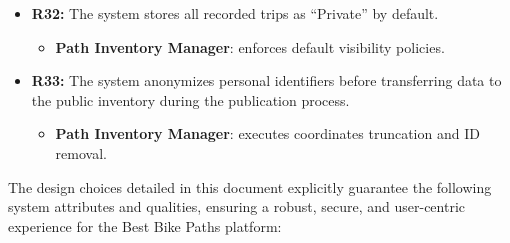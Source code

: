 \begin{itemize}
          \begin{itemize}
              \item \textbf{Trip Controller}: manages the automatic lifecycle termination of sessions.
          \end{itemize}
    \item \textbf{R32:} The system stores all recorded trips as “Private” by default.
          \begin{itemize}
              \item \textbf{Path Inventory Manager}: enforces default visibility policies.
          \end{itemize}
    \item \textbf{R33:} The system anonymizes personal identifiers before transferring data to the public inventory during the publication process.
          \begin{itemize}
              \item \textbf{Path Inventory Manager}: executes coordinates truncation and ID removal.
          \end{itemize}
\end{itemize}

The design choices detailed in this document explicitly guarantee the following system attributes and qualities, ensuring a robust, secure, and user-centric experience for the Best Bike Paths platform:

